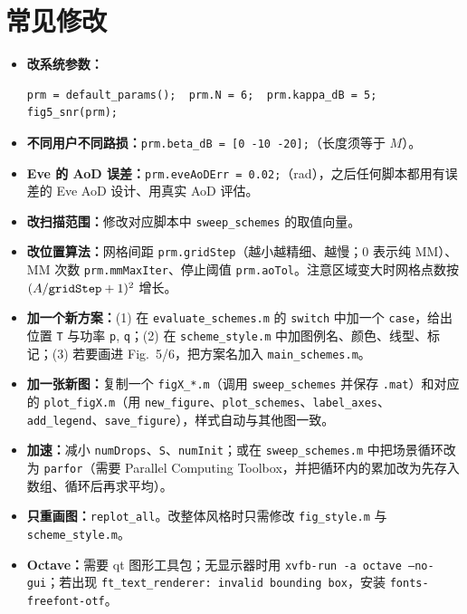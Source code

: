 \documentclass[11pt,a4paper]{ctexart}
\newcommand{\code}[1]{\texttt{#1}}
\begin{document}
\section{常见修改}
\begin{itemize}
\item \textbf{改系统参数：}
\begin{lstlisting}
prm = default_params();  prm.N = 6;  prm.kappa_dB = 5;
fig5_snr(prm);
\end{lstlisting}
\item \textbf{不同用户不同路损：}\code{prm.beta\_dB = [0 -10 -20];}（长度须等于 $M$）。
\item \textbf{Eve 的 AoD 误差：}\code{prm.eveAoDErr = 0.02;}（rad），之后任何脚本都用有误差的 Eve AoD 设计、用真实 AoD 评估。
\item \textbf{改扫描范围：}修改对应脚本中 \code{sweep\_schemes} 的取值向量。
\item \textbf{改位置算法：}网格间距 \code{prm.gridStep}（越小越精细、越慢；0 表示纯 MM）、MM 次数 \code{prm.mmMaxIter}、停止阈值 \code{prm.aoTol}。注意区域变大时网格点数按 $(A/{\tt gridStep}+1)^2$ 增长。
\item \textbf{加一个新方案：}(1) 在 \code{evaluate\_schemes.m} 的 \code{switch} 中加一个 \code{case}，给出位置 \code{T} 与功率 \code{p}, \code{q}；(2) 在 \code{scheme\_style.m} 中加图例名、颜色、线型、标记；(3) 若要画进 Fig.~5/6，把方案名加入 \code{main\_schemes.m}。
\item \textbf{加一张新图：}复制一个 \code{figX\_*.m}（调用 \code{sweep\_schemes} 并保存 \code{.mat}）和对应的 \code{plot\_figX.m}（用 \code{new\_figure}、\code{plot\_schemes}、\code{label\_axes}、\code{add\_legend}、\code{save\_figure}），样式自动与其他图一致。
\item \textbf{加速：}减小 \code{numDrops}、\code{S}、\code{numInit}；或在 \code{sweep\_schemes.m} 中把场景循环改为 \code{parfor}（需要 Parallel Computing Toolbox，并把循环内的累加改为先存入数组、循环后再求平均）。
\item \textbf{只重画图：}\code{replot\_all}。改整体风格时只需修改 \code{fig\_style.m} 与 \code{scheme\_style.m}。
\item \textbf{Octave：}需要 qt 图形工具包；无显示器时用 \code{xvfb-run -a octave --no-gui}；若出现 \code{ft\_text\_renderer: invalid bounding box}，安装 \code{fonts-freefont-otf}。
\end{itemize}

\end{document}
